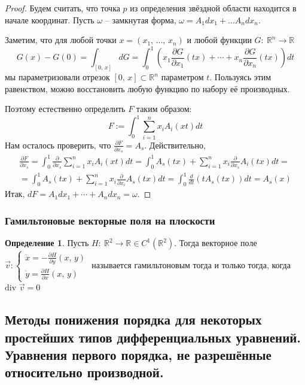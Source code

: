 \documentclass[a4paper,12pt]{article}
\theoremstyle{plain}
\theoremstyle{definition}
\newtheorem{definition}{Определение}[section]
\theoremstyle{remark}
\begin{document}
\begin{proof}
	Будем считать, что точка $p$ из определения звёздной области находится в начале координат. Пусть $\omega$ -- замкнутая форма, $\omega = A_1dx_1 + \ldots A_ndx_n$.

	Заметим, что для любой точки $x = (x_1,\,\ldots,\,x_n)$ и любой функции $G:\: \mathbb{R}^n \to \mathbb{R}$
	\[G(x) - G(0) = \int_{[0,\,x]}dG = \int_0^1\left(x_1\frac{\partial G}{\partial x_1}(tx) + \cdots + x_n\frac{\partial G}{\partial x_n}(tx)\right)dt\]
	мы параметризовали отрезок $[0,\,x] \subset \mathbb{R}^n$ параметром $t$. Пользуясь этим равенством, можно восстановить любую функцию по набору её производных.

	Поэтому естественно определить $F$ таким образом:
	\[F := \int_0^1 \sum_{i = 1}^n x_iA_i(xt)dt\]
	Нам осталось проверить, что $\frac{\partial F}{\partial x_s} = A_s$. Действительно,
	\begin{align*}
		\frac{\partial F}{\partial x_s} = \int_0^1 \frac{\partial}{\partial x_s} \sum_{i = 1}^n x_iA_i(xt)dt = \int_0^1 A_s(tx) + \sum_{i = 1}^n x_i \frac{\partial}{\partial x_s}A_i(tx)dt = \\
		= \int_0^1 A_s(tx) + \sum_{i = 1}^n x_i \frac{\partial}{\partial x_i}A_s(tx)dt = \int_0^1 \frac{d}{dt}(tA_s(tx))dt = A_s(x)
	\end{align*}
	Итак, $dF = A_1dx_1 + \cdots + A_ndx_n = \omega$.
\end{proof}

\subsubsection*{Гамильтоновые векторные поля на плоскости}
\begin{definition}
	Пусть $H:\: \mathbb{R}^2 \to \mathbb{R} \in C^1(\mathbb{R}^2)$. Тогда векторное поле
	$\vec{v}: \begin{cases}
			\dot{x} = -\frac{\partial H}{\partial y}(x,\,y) \\
			\dot{y} = \frac{\partial H}{\partial x}(x,\,y)
		\end{cases}$ называется гамильтоновым тогда и только тогда, когда $\text{div }\vec{v} = 0$
\end{definition}

\subsection{Методы понижения порядка для некоторых простейших типов дифференциальных уравнений. Уравнения первого порядка, не разрешённые относительно производной.}
\end{document}
